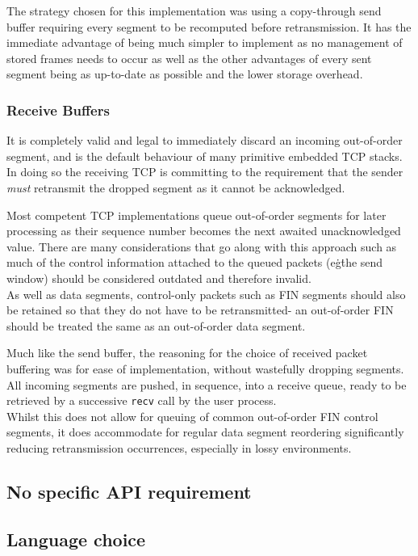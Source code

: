             The strategy chosen for this implementation was using a copy-through send buffer requiring every segment to be recomputed before retransmission. It has the immediate advantage of being much simpler to implement as no management of stored frames needs to occur as well as the other advantages of every sent segment being as up-to-date as possible and the lower storage overhead.

        \subsubsection{Receive Buffers}
            It is completely valid and legal to immediately discard an incoming out-of-order segment, and is the default behaviour of many primitive embedded TCP stacks. In doing so the receiving TCP is committing to the requirement that the sender \textit{must} retransmit the dropped segment as it cannot be acknowledged.

            Most competent TCP implementations queue out-of-order segments for later processing as their sequence number becomes the next awaited unacknowledged value. There are many considerations that go along with this approach such as much of the control information attached to the queued packets (e\.g\. the send window) should be considered outdated and therefore invalid. \\
            As well as data segments, control-only packets such as FIN segments should also be retained so that they do not have to be retransmitted- an out-of-order FIN should be treated the same as an out-of-order data segment.

            Much like the send buffer, the reasoning for the choice of received packet buffering was for ease of implementation, without wastefully dropping segments. All incoming segments are pushed, in sequence, into a receive queue, ready to be retrieved by a successive \texttt{recv} call by the user process. \\
            Whilst this does not allow for queuing of common out-of-order FIN control segments, it does accommodate for regular data segment reordering significantly reducing retransmission occurrences, especially in lossy environments.

    \subsection{No specific API requirement}
    \subsection{Language choice}

